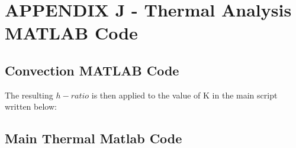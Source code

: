 \newpage
\section{APPENDIX J - Thermal Analysis MATLAB Code} \label{sec:appJ}
\subsection{Convection MATLAB Code}



The resulting $h-ratio$ is then applied to the value of K in the main script written below:

\subsection{Main Thermal Matlab Code}





